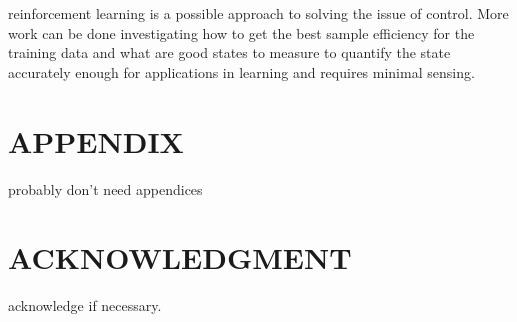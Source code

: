 \documentclass[letterpaper, 10 pt, conference]{ieeeconf}  %
\begin{document}
reinforcement learning is a possible approach to solving the issue of control. More work can be done investigating how to get the best sample efficiency for the training data and what are good states to measure to quantify the state accurately enough for applications in learning and requires minimal sensing.


\addtolength{\textheight}{-12cm}   %







\section*{APPENDIX}

probably don't need appendices

\section*{ACKNOWLEDGMENT}

acknowledge if necessary.






\end{document}
